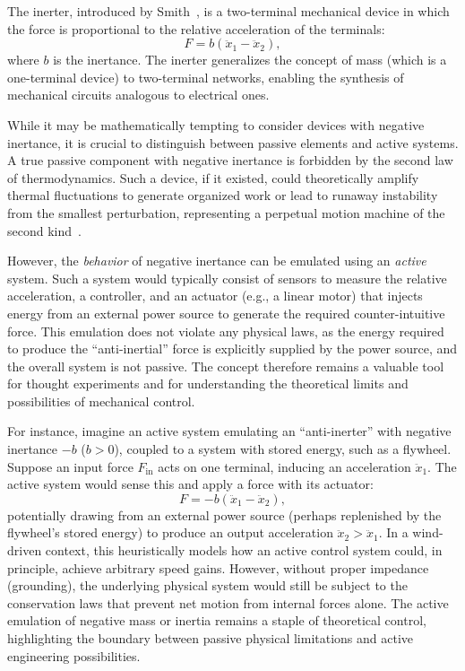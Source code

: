 \documentclass[reprint,aps,pra,superscriptaddress,longbibliography]{revtex4-2}
\begin{document}
The inerter, introduced by Smith~\cite{Smith2002}, is a two-terminal mechanical device in which the force is proportional to the relative acceleration of the terminals:
\begin{equation}
    F = b (\ddot{x}_1 - \ddot{x}_2),
\end{equation}
where $b$ is the inertance. The inerter generalizes the concept of mass (which is a one-terminal device) to two-terminal networks, enabling the synthesis of mechanical circuits analogous to electrical ones.

While it may be mathematically tempting to consider devices with negative inertance, it is crucial to distinguish between passive elements and active systems. A true passive component with negative inertance is forbidden by the second law of thermodynamics. Such a device, if it existed, could theoretically amplify thermal fluctuations to generate organized work or lead to runaway instability from the smallest perturbation, representing a perpetual motion machine of the second kind~\cite{saha-2021}.

However, the \emph{behavior} of negative inertance can be emulated using an \emph{active} system. Such a system would typically consist of sensors to measure the relative acceleration, a controller, and an actuator (e.g., a linear motor) that injects energy from an external power source to generate the required counter-intuitive force. This emulation does not violate any physical laws, as the energy required to produce the ``anti-inertial'' force is explicitly supplied by the power source, and the overall system is not passive. The concept therefore remains a valuable tool for thought experiments and for understanding the theoretical limits and possibilities of mechanical control.

For instance, imagine an active system emulating an ``anti-inerter'' with negative inertance $-b$ ($b > 0$), coupled to a system with stored energy, such as a flywheel. Suppose an input force $F_{\text{in}}$ acts on one terminal, inducing an acceleration $\ddot{x}_1$. The active system would sense this and apply a force with its actuator:
\begin{equation}
    F = -b (\ddot{x}_1 - \ddot{x}_2),
\end{equation}
potentially drawing from an external power source (perhaps replenished by the flywheel's stored energy) to produce an output acceleration $\ddot{x}_2 > \ddot{x}_1$. In a wind-driven context, this heuristically models how an active control system could, in principle, achieve arbitrary speed gains. However, without proper impedance (grounding), the underlying physical system would still be subject to the conservation laws that prevent net motion from internal forces alone. The active emulation of negative mass or inertia remains a staple of theoretical control, highlighting the boundary between passive physical limitations and active engineering possibilities.
\end{document}
